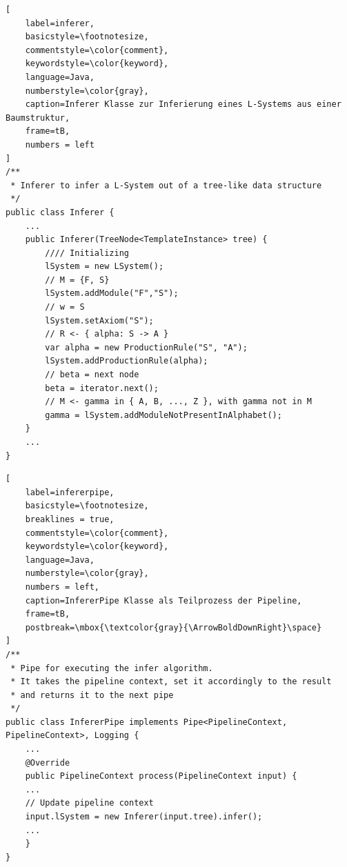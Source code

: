\begin{lstlisting}[
    label=inferer,
    basicstyle=\footnotesize,
    commentstyle=\color{comment},
    keywordstyle=\color{keyword},
    language=Java,
    numberstyle=\color{gray},
    caption=Inferer Klasse zur Inferierung eines L-Systems aus einer Baumstruktur,
    frame=tB,
    numbers = left
]
/**
 * Inferer to infer a L-System out of a tree-like data structure
 */
public class Inferer {
    ...
    public Inferer(TreeNode<TemplateInstance> tree) {
        //// Initializing
        lSystem = new LSystem();
        // M = {F, S}
        lSystem.addModule("F","S");
        // w = S
        lSystem.setAxiom("S");
        // R <- { alpha: S -> A }
        var alpha = new ProductionRule("S", "A");
        lSystem.addProductionRule(alpha);
        // beta = next node
        beta = iterator.next();
        // M <- gamma in { A, B, ..., Z }, with gamma not in M
        gamma = lSystem.addModuleNotPresentInAlphabet();
    }
    ...
}
\end{lstlisting}

\newpage

\begin{lstlisting}[
    label=infererpipe,
    basicstyle=\footnotesize,
    breaklines = true,
    commentstyle=\color{comment},
    keywordstyle=\color{keyword},
    language=Java,
    numberstyle=\color{gray},
    numbers = left,
    caption=InfererPipe Klasse als Teilprozess der Pipeline,
    frame=tB,
    postbreak=\mbox{\textcolor{gray}{\ArrowBoldDownRight}\space}
]
/**
 * Pipe for executing the infer algorithm.
 * It takes the pipeline context, set it accordingly to the result
 * and returns it to the next pipe
 */
public class InfererPipe implements Pipe<PipelineContext, PipelineContext>, Logging {
    ...
    @Override
    public PipelineContext process(PipelineContext input) {
    ...
    // Update pipeline context
    input.lSystem = new Inferer(input.tree).infer();
    ...
    }
}
\end{lstlisting}

